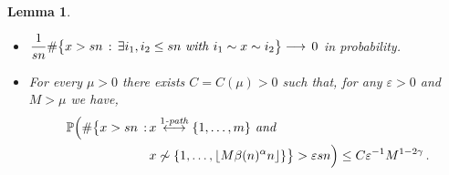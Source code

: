 \documentclass[12pt,a4paper]{article}
\numberwithin{equation}{section}
\newtheorem{lemma}[shared]{Lemma}
\begin{document}
\pagebreak[3]

\begin{lemma}\label{orderm}
\ \\[-5mm]
\begin{itemize}
    \item[(a)] $\displaystyle
   \frac{1}{sn}  \#\big\{x>sn\,:\,\exists i_1,i_2\le sn \text{ \emph{with} }i_1\sim x\sim i_2\big\} \longrightarrow \,0$ in probability.
\item[(b)] For every $\mu>0$ there exists $C=C(\mu)>0$ such that, for any $\varepsilon>0$ and $M>\mu$ we have,
   \begin{align*}
    \mathbb P \Big(
      \#\big\{x>sn\,:\, & x\overset{1\text{\emph{-path}}}{\longleftrightarrow}\{1,\dots,m\} \text{\emph{ and }} \\  & x\not\sim \{1,\dots, \lfloor M \beta(n)^{\alpha}n\rfloor\}\big\} > \varepsilon sn\Big) \le C  \varepsilon^{-1} M^{1-2\gamma}\,.
\end{align*}
\end{itemize}
\end{lemma}
\end{document}
